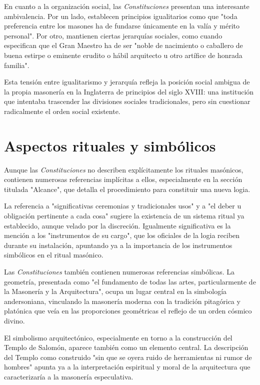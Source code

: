 \documentclass[a4paper,12pt,twoside]{book}
\begin{document}
En cuanto a la organización social, las \textit{Constituciones} presentan una interesante ambivalencia. Por un lado, establecen principios igualitarios como que "toda preferencia entre los masones ha de fundarse únicamente en la valía y mérito personal". Por otro, mantienen ciertas jerarquías sociales, como cuando especifican que el Gran Maestro ha de ser "noble de nacimiento o caballero de buena estirpe o eminente erudito o hábil arquitecto u otro artífice de honrada familia".

Esta tensión entre igualitarismo y jerarquía refleja la posición social ambigua de la propia masonería en la Inglaterra de principios del siglo XVIII: una institución que intentaba trascender las divisiones sociales tradicionales, pero sin cuestionar radicalmente el orden social existente.

\section{Aspectos rituales y simbólicos}

Aunque las \textit{Constituciones} no describen explícitamente los rituales masónicos, contienen numerosas referencias implícitas a ellos, especialmente en la sección titulada "Alcance", que detalla el procedimiento para constituir una nueva logia.

La referencia a "significativas ceremonias y tradicionales usos" y a "el deber u obligación pertinente a cada cosa" sugiere la existencia de un sistema ritual ya establecido, aunque velado por la discreción. Igualmente significativa es la mención a los "instrumentos de su cargo", que los oficiales de la logia reciben durante su instalación, apuntando ya a la importancia de los instrumentos simbólicos en el ritual masónico.

Las \textit{Constituciones} también contienen numerosas referencias simbólicas. La geometría, presentada como "el fundamento de todas las artes, particularmente de la Masonería y la Arquitectura", ocupa un lugar central en la simbología andersoniana, vinculando la masonería moderna con la tradición pitagórica y platónica que veía en las proporciones geométricas el reflejo de un orden cósmico divino.

El simbolismo arquitectónico, especialmente en torno a la construcción del Templo de Salomón, aparece también como un elemento central. La descripción del Templo como construido "sin que se oyera ruido de herramientas ni rumor de hombres" apunta ya a la interpretación espiritual y moral de la arquitectura que caracterizaría a la masonería especulativa.
\end{document}
